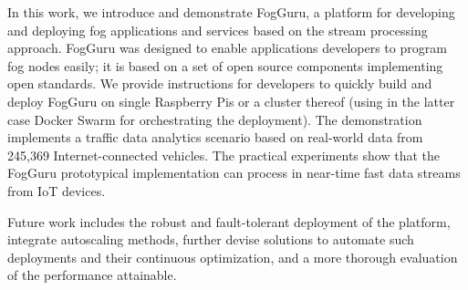 In this work, we introduce and demonstrate FogGuru, a platform for developing and deploying fog applications and services based on the stream processing approach. FogGuru was designed to enable applications developers to program fog nodes easily; it is based on a set of open source components implementing open standards. We provide instructions for developers to quickly build and deploy FogGuru on single Raspberry Pis or a cluster thereof (using in the latter case Docker Swarm for orchestrating the deployment).
The demonstration implements a traffic data analytics scenario based on real-world data from 245,369 Internet-connected vehicles. The practical experiments show that the FogGuru prototypical implementation can process in near-time fast data streams from IoT devices.

Future work includes the robust and fault-tolerant deployment of the platform,
integrate autoscaling methods, further devise solutions to automate such
deployments and their continuous optimization, and a more thorough evaluation of
the performance attainable.
